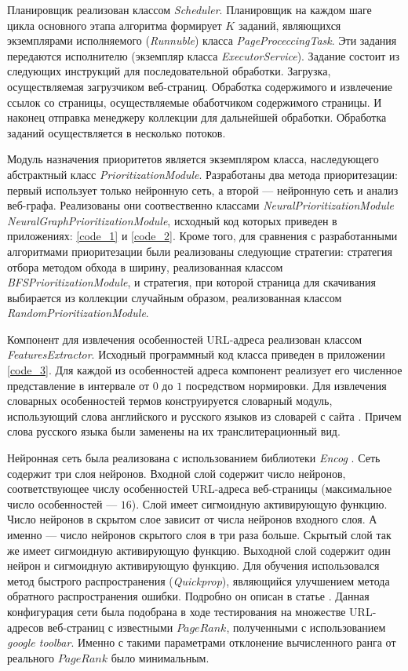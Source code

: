 Планировщик реализован классом \textit{Scheduler}. Планировщик на каждом шаге цикла основного этапа алгоритма формирует $K$ заданий, являющихся экземплярами исполняемого (\textit{Runnuble}) класса \textit{PageProceccingTask}. Эти задания передаются исполнителю (экземпляр класса \textit{ExecutorService}). Задание состоит из следующих инструкций для последовательной обработки. Загрузка, осуществляемая загрузчиком веб-страниц. Обработка содержимого и извлечение ссылок со страницы, осуществляемые обаботчиком содержимого страницы. И наконец отправка менеджеру коллекции для дальнейшей обработки. Обработка заданий осуществляется в несколько потоков.

Модуль назначения приоритетов является экземпляром класса, наследующего абстрактный класс \textit{PrioritizationModule}. Разработаны два метода приоритезации: первый использует только нейронную сеть, а второй --- нейронную сеть и анализ веб-графа. Реализованы они соотвественно классами \textit{NeuralPrioritizationModule} \textit{NeuralGraphPrioritizationModule}, исходный код которых приведен в приложениях: \ref{code_1} и \ref{code_2}. Кроме того, для сравнения с разработанными алгоритмами приоритезации были реализованы следующие стратегии: стратегия отбора методом обхода в ширину, реализованная классом \textit{BFSPrioritizationModule}, и стратегия, при которой страница для скачивания выбирается из коллекции случайным образом, реализованная классом \textit{RandomPrioritizationModule}.

Компонент для извлечения особенностей URL-адреса реализован классом \textit{FeaturesExtractor}. Исходный программный код класса приведен в приложении \ref{code_3}. Для каждой из особенностей адреса компонент реализует его численное представление в интервале от $0$ до $1$ посредством нормировки. Для извлечения словарных особенностей термов конструируется словарный модуль, использующий слова английского и русского языков из словарей с сайта \cite{dict}. Причем слова русского языка были заменены на их транслитерационный вид.

Нейронная сеть была реализована с использованием библиотеки \textit{Encog} \cite{encog}. Сеть содержит три слоя нейронов. Входной слой содержит число нейронов, соответствующее числу особенностей URL-адреса веб-страницы (максимальное число особенностей --- $16$). Слой имеет сигмоидную активирующую функцию. Число нейронов в скрытом слое зависит от числа нейронов входного слоя. А именно --- число нейронов скрытого слоя в три раза больше. Скрытый слой так же имеет сигмоидную активирующую функцию. Выходной слой содержит один нейрон и сигмоидную активирующую функцию. Для обучения использовался метод быстрого распространения (\textit{Quickprop}), являющийся улучшением метода обратного распространения ошибки. Подробно он описан в статье \cite{Fahlman88anempirical}. Данная конфигурация сети была подобрана в ходе тестирования на множестве URL-адресов веб-страниц с известными $PageRank$, полученными с использованием \textit{google toolbar}. Именно с такими параметрами отклонение вычисленного ранга от реального $PageRank$ было минимальным.

